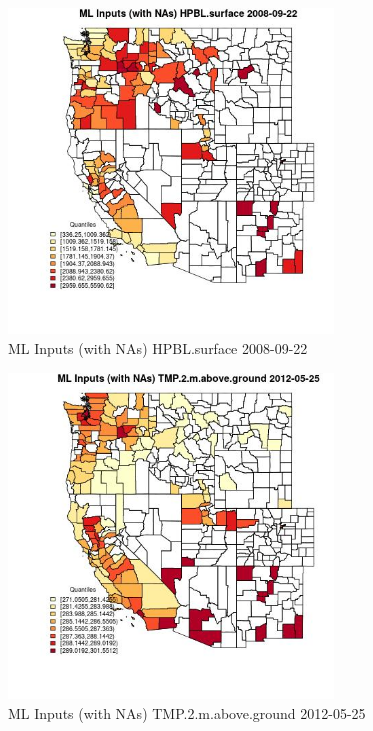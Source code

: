 \begin{figure} 
\centering  
\includegraphics[width=0.77\textwidth]{Code_Outputs/Report_ML_input_PM25_Step4_part_e_de_duplicated_aves_compiled_2019-05-18wNAs_CountyHPBLsurfaceMean2008-09-22_2008-09-22.jpg} 
\caption{\label{fig:Report_ML_input_PM25_Step4_part_e_de_duplicated_aves_compiled_2019-05-18wNAsCountyHPBLsurfaceMean2008-09-22_2008-09-22}ML Inputs (with NAs) HPBL.surface 2008-09-22} 
\end{figure} 
 

\clearpage 

\begin{figure} 
\centering  
\includegraphics[width=0.77\textwidth]{Code_Outputs/Report_ML_input_PM25_Step4_part_e_de_duplicated_aves_compiled_2019-05-18wNAs_CountyTMP2mabovegroundMean2012-05-25_2012-05-25.jpg} 
\caption{\label{fig:Report_ML_input_PM25_Step4_part_e_de_duplicated_aves_compiled_2019-05-18wNAsCountyTMP2mabovegroundMean2012-05-25_2012-05-25}ML Inputs (with NAs) TMP.2.m.above.ground 2012-05-25} 
\end{figure} 
 

